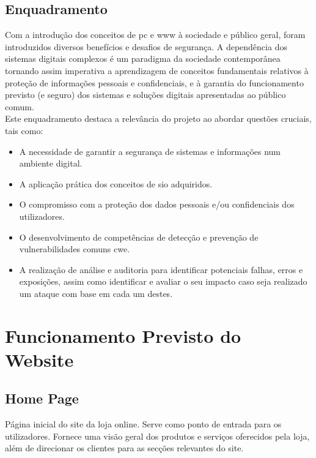 \section{Enquadramento}
\label{sec.enquadramento}
Com a introdução dos conceitos de \ac{pc} e \ac{www} à sociedade e público geral, foram introduzidos diversos benefícios e desafios de segurança. A dependência dos sistemas digitais complexos é um paradigma da sociedade contemporânea tornando assim imperativa a aprendizagem de conceitos fundamentais relativos à proteção de informações pessoais e confidenciais, e à garantia do funcionamento previsto (e seguro) dos sistemas e soluções digitais apresentadas ao público comum. \\

Este enquadramento destaca a relevância do projeto ao abordar questões cruciais, tais como:

\begin{itemize}
  \item A necessidade de garantir a segurança de sistemas e informações num ambiente digital.
  \item A aplicação prática dos conceitos de \ac{sio} adquiridos.
  \item O compromisso com a proteção dos dados pessoais e/ou confidenciais dos utilizadores.
  \item O desenvolvimento de competências de detecção e prevenção de vulnerabilidades comuns \ac{cwe}.
  \item A realização de análise e auditoria para identificar potenciais falhas, erros e exposições, assim como identificar e avaliar o seu impacto caso seja realizado um ataque com base em cada um destes.
\end{itemize}

%
%
\chapter{Funcionamento Previsto do Website}
\label{chap.Funcionamento}

\section{Home Page}
\label{sec.home}

Página inicial do site da loja online. Serve como ponto de entrada para os utilizadores. Fornece uma visão geral dos produtos e serviços oferecidos pela loja, além de direcionar os clientes para as secções relevantes do site.


